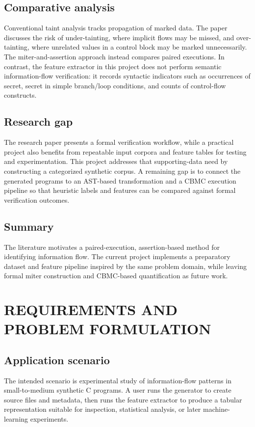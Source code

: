 \documentclass[12pt,a4paper,oneside]{report}
\begin{document}
\section{Comparative analysis}
Conventional taint analysis tracks propagation of marked data. The paper discusses the risk of under-tainting, where implicit flows may be missed, and over-tainting, where unrelated values in a control block may be marked unnecessarily. The miter-and-assertion approach instead compares paired executions. In contrast, the feature extractor in this project does not perform semantic information-flow verification: it records syntactic indicators such as occurrences of secret, secret in simple branch/loop conditions, and counts of control-flow constructs.\par

\section{Research gap}
The research paper presents a formal verification workflow, while a practical project also benefits from repeatable input corpora and feature tables for testing and experimentation. This project addresses that supporting-data need by constructing a categorized synthetic corpus. A remaining gap is to connect the generated programs to an AST-based transformation and a CBMC execution pipeline so that heuristic labels and features can be compared against formal verification outcomes.\par

\section{Summary}
The literature motivates a paired-execution, assertion-based method for identifying information flow. The current project implements a preparatory dataset and feature pipeline inspired by the same problem domain, while leaving formal miter construction and CBMC-based quantification as future work.\par

\chapter{REQUIREMENTS AND PROBLEM FORMULATION}

\section{Application scenario}
The intended scenario is experimental study of information-flow patterns in small-to-medium synthetic C programs. A user runs the generator to create source files and metadata, then runs the feature extractor to produce a tabular representation suitable for inspection, statistical analysis, or later machine-learning experiments.\par
\end{document}
